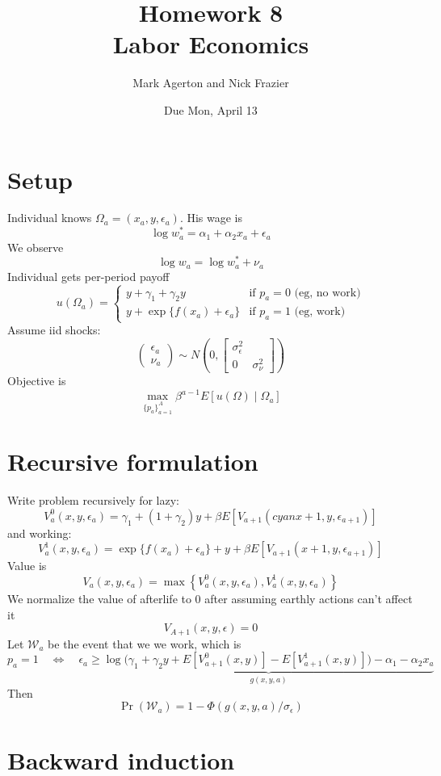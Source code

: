 \documentclass[11pt,letterpaper]{article}
\title{\textbf{Homework 8} \\ Labor Economics}
\author{Mark Agerton and  Nick Frazier}
\date{Due Mon, April 13}
\begin{document}
\maketitle

\section{Setup}
Individual knows $\Omega_a = (x_a, y, \epsilon_a)$. His wage is 
\[
    \log w_a^* = \alpha_1 + \alpha_2 x_a + \epsilon_a
\]
We observe
\[
    \log w_a = \log w_a^* + \nu_a
\]
Individual gets per-period payoff
\[
u(\Omega_a) = 
\begin{cases}
    y + \gamma_1 + \gamma_2y         & \text{if } p_a = 0  \text{ (eg, no work)} \\
    y + \exp\{f(x_a) + \epsilon_a\}  & \text{if } p_a = 1  \text{ (eg, work)} 
\end{cases}
\]
Assume iid shocks:
\[
\begin{pmatrix}
\epsilon_a \\ \nu_a
\end{pmatrix}
\sim 
N\left(
0,
\begin{bmatrix}
\sigma_\epsilon^2  & \\
0 & \sigma^2_\nu
\end{bmatrix}
\right)
\]
Objective is
\[
\max_{\{p_a\}_{a=1}^A} \beta^{a-1} E\left[ u(\Omega) \middle| \Omega_a \right]
\]

\section{Recursive formulation}

Write problem recursively for lazy:
\[
V_a^0(x,y,\epsilon_a) = \gamma_1 + (1+\gamma_2)y + \beta E[V_{a+1}( cyan x+1,y,\epsilon_{a+1})]
\]
and working:
\[
V_a^1(x,y,\epsilon_a) =
\exp\{f(x_a) + \epsilon_a\} + y + \beta E[V_{a+1}(x+1,y, \epsilon_{a+1})]
\]
Value is
\[
V_a(x,y,\epsilon_a) = \max\left\{V_a^0(x,y,\epsilon_a), V_a^1(x,y,\epsilon_a)\right\}
\]
We normalize the value of afterlife to 0 after assuming earthly actions can't affect it
\[
    V_{A+1}(x,y,\epsilon) = 0
\]
Let $\mathcal W_a$ be the event that we we work, which is 
\[
p_a = 1 \quad \Leftrightarrow \quad
\epsilon_a \geq \underbrace{ \log \bigg( \gamma_1 + \gamma_2 y + E[V_{a+1}^0(x,y)] - E[V_{a+1}^1(x,y)] \bigg) - \alpha_1 - \alpha_2 x_a }_{g(x,y,a)}
\]
Then 
\[
\Pr(\mathcal W_a) = 1- \Phi(g(x,y,a)/\sigma_\epsilon)
\]

\section{Backward induction}
\end{document}

